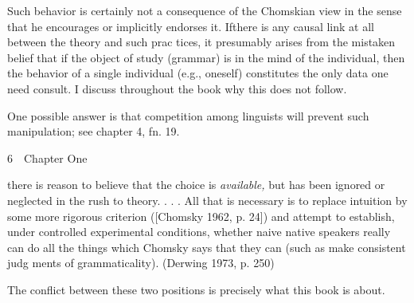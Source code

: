 \begin{listWWNumlxixleveli}
\item 
\begin{styleStandard}
Such behavior is certainly not a consequence of the Chomskian view in the sense that he encourages or implicitly endorses it. Ifthere is any causal link at all between the theory and such prac\- tices, it presumably arises from the mistaken belief that if the object of study (grammar) is in the mind of the individual, then the behavior of a single individual (e.g., oneself) constitutes the only data one need consult. I discuss throughout the book why this does not follow.
\end{styleStandard}


\item 
\begin{styleStandard}
One possible answer is that competition among linguists will prevent such manipulation; see chapter 4, fn. 19.
\end{styleStandard}


\end{listWWNumlxixleveli}
\clearpage\setcounter{page}{1}\begin{styleStandard}
6\ \ Chapter One
\end{styleStandard}


\begin{styleTextbody}
there is reason to believe that the choice is \textit{available,}\textit{ }but has been ignored or neglected in the rush to theory. . . . All that is necessary is {\textquotesingle}to replace intuition by some more rigorous criterion{\textquotesingle} ([Chomsky 1962, p. 24]) and attempt to establish, under controlled experimental conditions, whether naive native speakers really can do all the things which Chomsky says that they can (such as make consistent judg\- ments of grammaticality). (Derwing 1973, p. 250)
\end{styleTextbody}


\begin{styleTextbody}
The conflict between these two positions is precisely what this book is about.
\end{styleTextbody}


